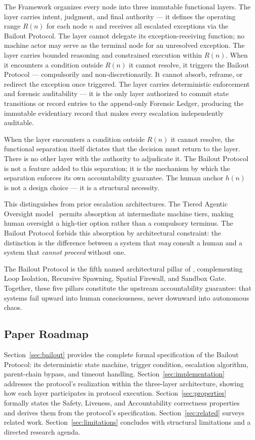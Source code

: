 The \bxthree{} Framework organizes every node into three immutable functional layers. The \purpose{} layer carries intent, judgment, and final authority — it defines the operating range $R(n)$ for each node $n$ and receives all escalated exceptions via the Bailout Protocol. The \purpose{} layer cannot delegate its exception-receiving function; no machine actor may serve as the terminal node for an unresolved exception. The \bounds{} layer carries bounded reasoning and constrained execution within $R(n)$. When it encounters a condition outside $R(n)$ it cannot resolve, it triggers the Bailout Protocol — compulsorily and non-discretionarily. It cannot absorb, reframe, or redirect the exception once triggered. The \fact{} layer carries deterministic enforcement and forensic auditability — it is the only layer authorized to commit state transitions or record entries to the append-only Forensic Ledger, producing the immutable evidentiary record that makes every escalation independently auditable.

When the \bounds{} layer encounters a condition outside $R(n)$ it cannot resolve, the functional separation itself dictates that the decision must return to the \purpose{} layer. There is no other layer with the authority to adjudicate it. The Bailout Protocol is not a feature added to this separation; it is the mechanism by which the separation enforces its own accountability guarantee. The human anchor $h(n)$ is not a design choice — it is a structural necessity.

This distinguishes \bxthree{} from prior escalation architectures. The Tiered Agentic Oversight model~\cite{kim2025tao} permits absorption at intermediate machine tiers, making human oversight a high-tier option rather than a compulsory terminus. The Bailout Protocol forbids this absorption by architectural constraint: the distinction is the difference between a system that \emph{may} consult a human and a system that \emph{cannot proceed} without one.

The Bailout Protocol is the fifth named architectural pillar of \bxthree{}, complementing Loop Isolation, Recursive Spawning, Spatial Firewall, and Sandbox Gate. Together, these five pillars constitute the upstream accountability guarantee: that \bxthree{} systems fail upward into human consciousness, never downward into autonomous chaos.

\subsection{Paper Roadmap}
\label{sec:roadmap}

Section~\ref{sec:bailout} provides the complete formal specification of the Bailout Protocol: its deterministic state machine, trigger condition, escalation algorithm, parent-chain bypass, and timeout handling. Section~\ref{sec:implementation} addresses the protocol's realization within the \bxthree{} three-layer architecture, showing how each layer participates in protocol execution. Section~\ref{sec:properties} formally states the Safety, Liveness, and Accountability correctness properties and derives them from the protocol's specification. Section~\ref{sec:related} surveys related work. Section~\ref{sec:limitations} concludes with structural limitations and a directed research agenda.
